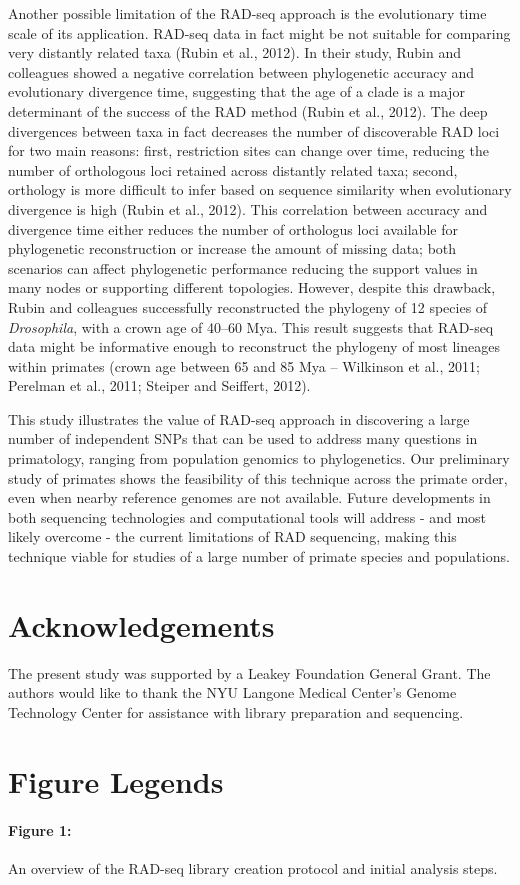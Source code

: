 \documentclass[12pt]{article}
\begin{document}
Another possible limitation of the RAD-seq approach is the evolutionary time scale of its application. RAD-seq data in fact might be not suitable for comparing very distantly related taxa (Rubin et al., 2012). In their study, Rubin and colleagues showed a negative correlation between phylogenetic accuracy and evolutionary divergence time, suggesting that the age of a clade is a major determinant of the success of the RAD method (Rubin et al., 2012). The deep divergences between taxa in fact decreases the number of discoverable RAD loci for two main reasons: first, restriction sites can change over time, reducing the number of orthologous loci retained across distantly related taxa; second, orthology is more difficult to infer based on sequence similarity when evolutionary divergence is high (Rubin et al., 2012). This correlation between accuracy and divergence time either reduces the number of orthologus loci available for phylogenetic reconstruction or increase the amount of missing data; both scenarios can affect phylogenetic performance reducing the support values in many nodes or supporting different topologies. However, despite this drawback, Rubin and colleagues successfully reconstructed the phylogeny of 12 species of \emph{Drosophila}, with a crown age of 40–60 Mya. This result suggests that RAD-seq data might be informative enough to reconstruct the phylogeny of most lineages within primates (crown age between 65 and 85 Mya – Wilkinson et al., 2011; Perelman et al., 2011; Steiper and Seiffert, 2012).

This study illustrates the value of RAD-seq approach in discovering a large number of independent SNPs that can be used to address many questions in primatology, ranging from population genomics to phylogenetics. Our preliminary study of primates shows the feasibility of this technique across the primate order, even when nearby reference genomes are not available. Future developments in both sequencing technologies and computational tools will address - and most likely overcome - the current limitations of RAD sequencing, making this technique viable for studies of a large number of primate species and populations.

\section{Acknowledgements}

The present study was supported by a Leakey Foundation General Grant. The authors would like to thank the NYU Langone Medical Center's Genome Technology Center for assistance with library preparation and sequencing.

\section{Figure Legends}

\paragraph{Figure 1:} An overview of the RAD-seq library creation protocol and initial analysis steps.
\end{document}
